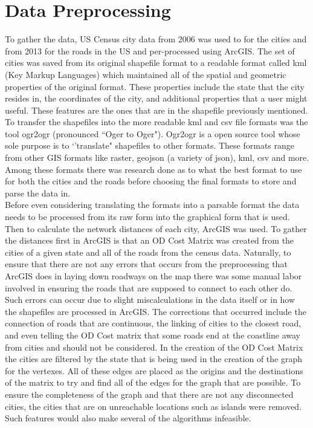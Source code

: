 \documentclass[midd]{thesis}
\newcommand{\tab}{\hspace*{2em}}
\begin{document}
\section{Data Preprocessing}
\tab To gather the data, US Census city data from 2006 was used to for the cities and from 2013 for the roads in the US and per-processed using ArcGIS. The set of cities was saved from its original shapefile format to a readable format called kml (Key Markup Languages) which maintained all of the spatial and geometric properties of the original format. These properties include the state that the city resides in, the coordinates of the city, and additional properties that a user might useful. These features are the ones that are in the shapefile previously mentioned. To transfer the shapefiles into the more readable kml and csv file formats was the tool ogr2ogr (pronounced ``Oger to Oger"). Ogr2ogr is a open source tool whose sole purpose is to `'translate" shapefiles to other formats. These formats range from other GIS formats like raster,  geojson (a variety of json), kml, csv and more. Among these formats there was research done as to what the best format to use for both the cities and the roads before choosing the final formats to store and parse the data in.\\
\tab Before even considering translating the formats into a parsable format the data needs to be processed from its raw form into the graphical form that is used. Then to calculate the network distances of each city, ArcGIS was used. To gather the distances first in ArcGIS is that an OD Cost Matrix was created from the cities of a given state and all of the roads from the census data. Naturally, to ensure that there are not any errors that occurs from the preprocessing that ArcGIS does in laying down roadways on the map there was some manual labor involved in ensuring the roads that are supposed to connect to each other do. Such errors can occur due to slight miscalculations in the data itself or in how the shapefiles are processed in ArcGIS. The corrections that occurred include the connection of roads that are continuous, the linking of cities to the closest road, and even telling the OD Cost matrix that  some roads end at the coastline away from cities and should not be considered. In the creation of the OD Cost Matrix the cities are filtered by the state that is being used in the creation of the graph for the vertexes. All of these edges are placed as the origins and the destinations of the matrix to try and find all of the edges for the graph that are possible. To ensure the completeness of the graph and that there are not any disconnected cities, the cities that are on unreachable locations such as islands were removed. Such features would also make several of the algorithms infeasible.\\
\end{document}
